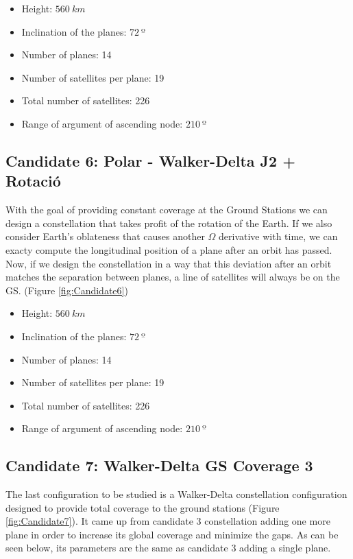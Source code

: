 \begin{itemize}
	\item Height: $560~{km}$ 
	\item Inclination of the planes: $72~{º}$  
	\item Number of planes: 14
	\item Number of satellites per plane: 19
	\item Total number of satellites: 226
	\item Range of argument of ascending node: $210~{º}$
\end{itemize}


\subsection{Candidate 6: Polar - Walker-Delta J2 + Rotació}

With the goal of providing constant coverage at the Ground Stations we can design a constellation that takes profit of the rotation of the Earth. If we also consider Earth's oblateness that causes another $\Omega$ derivative with time, we can exacty compute the longitudinal position of a plane after an orbit has passed. Now, if we design the constellation in a way that this deviation after an orbit matches the separation between planes, a line of satellites will always be on the GS. (Figure \ref{fig:Candidate6})

\begin{itemize}
\item Height: $560~{km}$ 
\item Inclination of the planes: $72~{º}$  
\item Number of planes: 14
\item Number of satellites per plane: 19
\item Total number of satellites: 226
\item Range of argument of ascending node: $210~{º}$
\end{itemize}

\subsection{Candidate 7: Walker-Delta GS Coverage 3}

The last configuration to be studied is a Walker-Delta constellation configuration designed to provide total coverage to the ground stations (Figure \ref{fig:Candidate7}). It came up from candidate 3 constellation adding one more plane in order to increase its global coverage and minimize the gaps. As can be seen below, its parameters are the same as candidate 3 adding a single plane.


